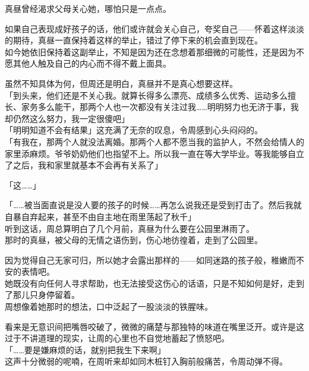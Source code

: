 真昼曾经渴求父母关心她，哪怕只是一点点。

如果自己表现成好孩子的话，他们或许就会关心自己，夸奖自己——怀着这样淡淡的期待，真昼一直保持着这样的举止，错过了停下来的机会直到现在。\\

如今她依旧保持着这副举止，不知是因为还在念想着那细微的可能性，还是因为不愿其他人触及自己的内心而不得不戴上面具。

虽然不知具体为何，但周还是明白，真昼并不是真心想要这样。\\

「到头来，他们还是不关心我。就算长得多么漂亮、成绩多么优秀、运动多么擅长、家务多么能干，那两个人也一次都没有关注过我……明明努力也无济于事，我却仍然这么努力，我一定很傻吧」\\

「明明知道不会有结果」这充满了无奈的叹息，令周感到心头闷闷的。\\

「有我在，那两个人就没法离婚。那两个人都不愿当我的监护人，不然会给情人的家里添麻烦。爷爷奶奶他们也指望不上。所以我一直在等大学毕业。等我能够自立了之后，我和家里就基本不会再有关系了」

「这……」

「……被当面直说是没人要的孩子的时候……再怎么说我还是受到打击了。然后我就自暴自弃起来，甚至不由自主地在雨里荡起了秋千」\\

听到这话，周总算明白了几个月前，真昼为什么要在公园里淋雨了。\\

那时的真昼，被父母的无情之语伤到，伤心地彷徨着，走到了公园里。

因为觉得自己无家可归，所以她才会露出那样的——如同迷路的孩子般，稚嫩而不安的表情吧。\\

她既没有向任何人寻求帮助，也无法接受这伤心的话语，只是不知如何是好，走到了那儿只身停留着。\\

周想像着她那时的想法，口中泛起了一股淡淡的铁腥味。

看来是无意识间把嘴唇咬破了，微微的痛楚与那独特的味道在嘴里泛开。或许是这过于不讲道理的现实，让周的心里也不自觉地蓄起了愤怒吧。\\

「……要是嫌麻烦的话，就别把我生下来啊」\\

这声十分微弱的呢喃，在周听来却如同木桩钉入胸前般痛苦，令周动弹不得。\\

